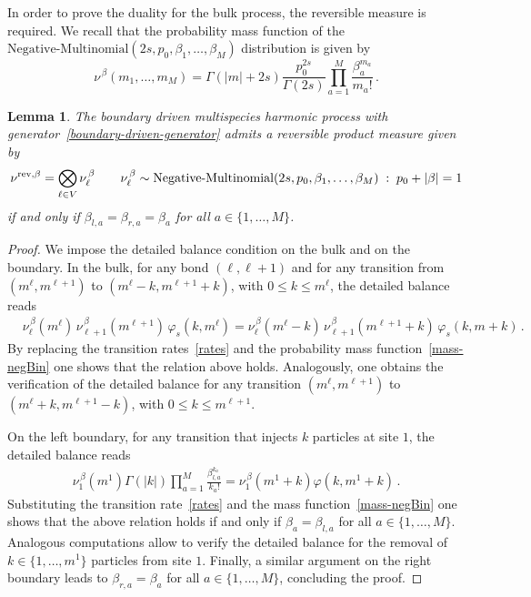 \documentclass[11pt]{article}
\numberwithin{equation}{section}
\newtheorem{lemma}[theorem]{Lemma}
\newcommand{\M}{M}
\begin{document}
In order to prove the duality for the bulk process, the reversible measure is required. 
We recall that the probability mass function of the $\text{Negative-Multinomial}(2s,p_{0},\beta_{1},\ldots,\beta_{\M})$ distribution is given by
\begin{equation}\label{mass-negBin}
    \nu^{\,\beta}(m_{1},\ldots,m_{\M})
    =
    \Gamma(|m|+2s)\frac{p_{0}^{2s}}{\Gamma(2s)}
    \prod_{a=1}^{\M}\frac{\beta_{a}^{m_{a}}}{m_{a}!}\,.
\end{equation}
\begin{lemma}\label{lemma-reversibleMeasure-M-harmonic-boundaries}
	The boundary driven multispecies harmonic process with generator~\eqref{boundary-driven-generator} admits a reversible product measure given by
	\begin{equation}\label{reversibleMeasure-M-harmonic-boundary}
		\nu^{\rm{rev},\beta}=\bigotimes_{\ell\in V}\nu_{\ell}^{\,\beta}\qquad \nu^{\,\beta}_{\ell}\sim \textnormal{Negative-Multinomial}(2s,p_{0},\beta_{1},\ldots,\beta_{\M})\;:\;p_{0}+|\beta|=1
	\end{equation} 
	if and only if $\beta_{l,a}=\beta_{r,a}=\beta_{a}$ for all $a\in\{1,\ldots,\M\}$. 
\end{lemma} 
\begin{proof}We impose the detailed balance condition on the bulk and on the boundary.
In the bulk, for any bond $(\ell, \ell+1)$ and for any transition from $(m^{\ell},m^{\ell+1})$ to $({m}^{\ell}-k,m^{\ell+1}+k)$, with $0\le k\le m^{\ell}$,
the detailed balance reads
\begin{align}
	&\nu_{\ell}^{\,\beta}(m^{\ell})\,\nu_{\ell+1}^{\,\beta}(m^{\ell+1})\,\varphi_{s}(k,m^{\ell})=	\nu_{\ell}^{\,\beta}(m^{\ell}-k)\,\nu_{\ell+1}^{\,\beta}(m^{\ell+1}+k)\,\varphi_{s}(k,m+k)\,.
\end{align}
By replacing the transition rates~\eqref{rates} and the probability mass function~\eqref{mass-negBin} one shows that the relation above holds. Analogously, one obtains the verification of the detailed balance for any transition  $(m^{\ell},m^{\ell+1})$ to $({m}^{\ell}+k,m^{\ell+1}-k)$, with $0\le k\le m^{\ell+1}$.

On the left boundary, for any transition that injects $k$ particles at site $1$, the detailed balance reads
\begin{align}
	\nu_{1}^{\,\beta}(m^{1})\Gamma(|k|)\prod_{a=1}^{\M}\frac{\beta_{l,a}^{k_{a}}}{k_{a}!}=\nu_{1}^{\,\beta}(m^{1}+k)\varphi(k,m^{1}+k)\,.
\end{align}
Substituting the transition rate~\eqref{rates} and the mass function~\eqref{mass-negBin} one shows that the above relation holds if and only if $\beta_{a}=\beta_{l,a}$ for all $a\in \{1,\ldots, \M\}$. Analogous computations allow to verify the detailed balance for the removal of $k\in\{1,\ldots, m^{1}\}$ particles from site $1$. Finally, a similar argument on the right boundary leads to $\beta_{r,a}=\beta_{a}$ for all $a\in \{1,\ldots,\M\}$, concluding the proof.
\end{proof}
\end{document}
